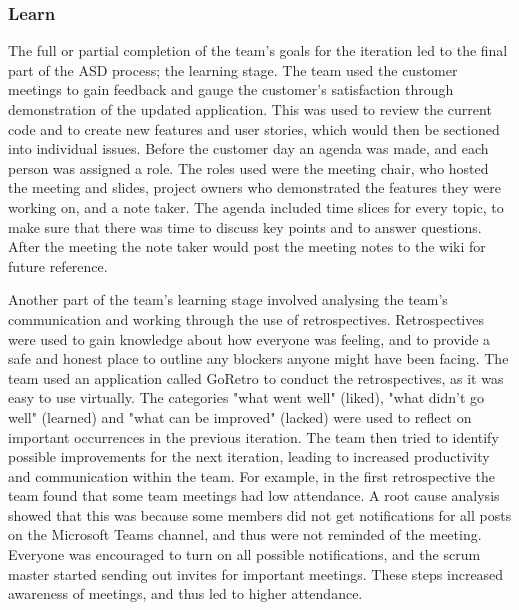 \documentclass{l3proj}
\begin{document}
\subsubsection{Learn}
\label{learn}
The full or partial completion of the team's goals for the iteration led to the final part of the ASD process; the learning stage. The team used the customer meetings to gain feedback and gauge the customer's satisfaction through demonstration of the updated application. This was used to review the current code and to create new features and user stories, which would then be sectioned into individual issues. Before the customer day an agenda was made, and each person was assigned a role. The roles used were the meeting chair, who hosted the meeting and slides, project owners who demonstrated the features they were working on, and a note taker. The agenda included time slices for every topic, to make sure that there was time to discuss key points and to answer questions. 
After the meeting the note taker would post the meeting notes to the wiki for future reference.

Another part of the team's learning stage involved analysing the team's communication and working through the use of retrospectives. Retrospectives were used to gain knowledge about how everyone was feeling, and to provide a safe and honest place to outline any blockers anyone might have been facing. The team used an application called GoRetro \cite{GoRetro} to conduct the retrospectives, as it was easy to use virtually. The categories "what went well" (liked), "what didn't go well" (learned) and "what can be improved" (lacked) were used to reflect on important occurrences in the previous iteration. The team then tried to identify possible improvements for the next iteration, leading to increased productivity and communication within the team. For example, in the first retrospective the team found that some team meetings had low attendance. A root cause analysis showed that this was because some members did not get notifications for all posts on the Microsoft Teams channel, and thus were not reminded of the meeting. Everyone was encouraged to turn on all possible notifications, and the scrum master started sending out invites for important meetings. These steps increased awareness of meetings, and thus led to higher attendance.
\end{document}
